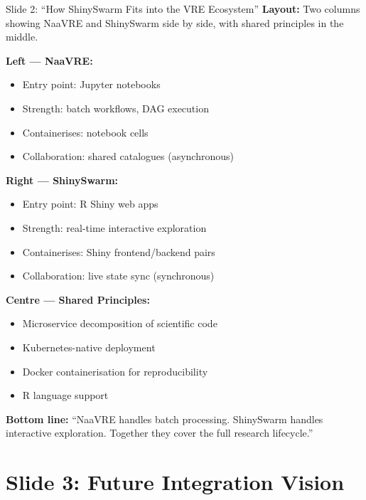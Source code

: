 \documentclass[12pt,a4paper]{article}
\begin{document}
\begin{slidebox}{Slide 2: ``How ShinySwarm Fits into the VRE Ecosystem''}
\textbf{Layout:} Two columns showing NaaVRE and ShinySwarm side by side, with shared principles in the middle.

\textbf{Left --- NaaVRE:}
\begin{itemize}[nosep]
  \item Entry point: Jupyter notebooks
  \item Strength: batch workflows, DAG execution
  \item Containerises: notebook cells
  \item Collaboration: shared catalogues (asynchronous)
\end{itemize}

\textbf{Right --- ShinySwarm:}
\begin{itemize}[nosep]
  \item Entry point: R Shiny web apps
  \item Strength: real-time interactive exploration
  \item Containerises: Shiny frontend/backend pairs
  \item Collaboration: live state sync (synchronous)
\end{itemize}

\textbf{Centre --- Shared Principles:}
\begin{itemize}[nosep]
  \item Microservice decomposition of scientific code
  \item Kubernetes-native deployment
  \item Docker containerisation for reproducibility
  \item R language support
\end{itemize}

\textbf{Bottom line:} ``NaaVRE handles batch processing. ShinySwarm handles interactive exploration. Together they cover the full research lifecycle.''
\end{slidebox}

\section{Slide 3: Future Integration Vision}
\end{document}
